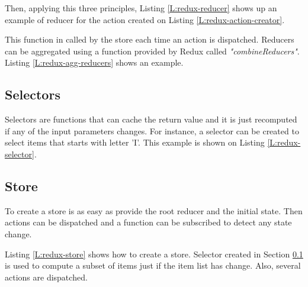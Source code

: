 Then, applying this three principles, Listing \ref{L:redux-reducer} shows up an
example of reducer for the action created on Listing 
\ref{L:redux-action-creator}.

\begin{codefigure}
\end{codefigure}

This function in called by the store each time an action is dispatched. 
Reducers can be aggregated using a function provided by Redux called
\textit{"combineReducers"}. Listing \ref{L:redux-agg-reducers} shows an example.

\begin{codefigure}
\end{codefigure}

\subsection{Selectors}
\label{S:selectors}

Selectors are functions that can cache the return value and it is just 
recomputed if any of the input parameters changes. For instance, a selector
can be created to select items that starts with letter 'I'. This example is
shown on Listing \ref{L:redux-selector}.

\begin{codefigure}
\end{codefigure}

\subsection{Store}

To create a store is as easy as provide the root reducer and the initial state.
Then actions can be dispatched and a function can be subscribed to detect any
state change.

Listing \ref{L:redux-store} shows how to create a store. Selector created in
Section \ref{S:selectors} is used to compute a subset of items just if the
item list has change. Also, several actions are dispatched.

\begin{codefigure}
\end{codefigure}


